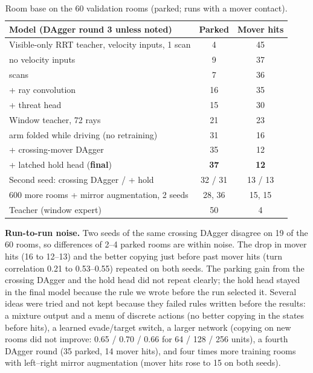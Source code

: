 \begin{table}[t]
\centering
\caption{Room base on the 60 validation rooms (parked; runs with a mover contact).}
\label{tab:progression}
\begin{tabular}{lcc}
\toprule
Model (DAgger round 3 unless noted) & Parked & Mover hits \\
\midrule
Visible-only RRT teacher, velocity inputs, 1 scan         & 4  & 45 \\ %
\quad no velocity inputs                           & 9  & 37 \\ %
\quad 3 scans                                      & 7  & 36 \\ %
\quad + ray convolution                            & 16 & 35 \\ %
\quad + threat head                                & 15 & 30 \\ %
Window teacher, 72 rays                            & 21 & 23 \\ %
\quad arm folded while driving (no retraining)     & 31 & 16 \\ %
\quad + crossing-mover DAgger                      & 35 & 12 \\ %
\quad + latched hold head (\textbf{final})         & \textbf{37} & \textbf{12} \\ %
\midrule
Second seed: crossing DAgger / + hold              & 32 / 31 & 13 / 13 \\ %
600 more rooms + mirror augmentation, 2 seeds      & 28, 36 & 15, 15 \\ %
Teacher (window expert)                            & 50 & 4 \\ %
\bottomrule
\end{tabular}
\end{table}

\textbf{Run-to-run noise.} Two seeds of the same crossing DAgger disagree on 19 of the 60 rooms, so differences of
2--4 parked rooms are within noise. The drop in mover hits (16 to 12--13) and the better copying just before past
mover hits (turn correlation 0.21 to 0.53--0.55) repeated on both seeds. The parking gain from the crossing DAgger and
the hold head did not repeat clearly; the hold head stayed in the final model because the rule we wrote before the run
selected it. Several ideas were tried and not kept because they failed rules written before the results: a mixture
output and a menu of discrete actions (no better copying in the states before hits), a learned evade/target switch,
a larger network (copying on new rooms did not improve: 0.65 / 0.70 / 0.66 for 64 / 128 / 256 units), a fourth DAgger
round (35 parked, 14 mover hits), and four times more training rooms with left--right mirror augmentation (mover
hits rose to 15 on both seeds).


